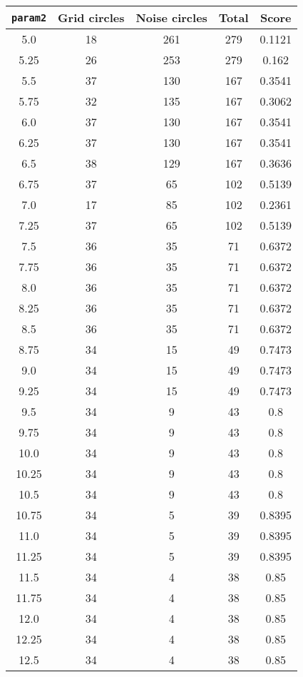 \documentclass[letterpaper, 12pt]{article}
\begin{document}
\begin{longtable}{|c|c|c|c|c|}
\hline
\textbf{\texttt{param2}} & \textbf{Grid circles} & \textbf{Noise circles} & \textbf{Total} & \textbf{Score} \\
\hline
5.0 & 18 & 261 & 279 & 0.1121 \\
\hline
5.25 & 26 & 253 & 279 & 0.162 \\
\hline
5.5 & 37 & 130 & 167 & 0.3541 \\
\hline
5.75 & 32 & 135 & 167 & 0.3062 \\
\hline
6.0 & 37 & 130 & 167 & 0.3541 \\
\hline
6.25 & 37 & 130 & 167 & 0.3541 \\
\hline
6.5 & 38 & 129 & 167 & 0.3636 \\
\hline
6.75 & 37 & 65 & 102 & 0.5139 \\
\hline
7.0 & 17 & 85 & 102 & 0.2361 \\
\hline
7.25 & 37 & 65 & 102 & 0.5139 \\
\hline
7.5 & 36 & 35 & 71 & 0.6372 \\
\hline
7.75 & 36 & 35 & 71 & 0.6372 \\
\hline
8.0 & 36 & 35 & 71 & 0.6372 \\
\hline
8.25 & 36 & 35 & 71 & 0.6372 \\
\hline
8.5 & 36 & 35 & 71 & 0.6372 \\
\hline
8.75 & 34 & 15 & 49 & 0.7473 \\
\hline
9.0 & 34 & 15 & 49 & 0.7473 \\
\hline
9.25 & 34 & 15 & 49 & 0.7473 \\
\hline
9.5 & 34 & 9 & 43 & 0.8 \\
\hline
9.75 & 34 & 9 & 43 & 0.8 \\
\hline
10.0 & 34 & 9 & 43 & 0.8 \\
\hline
10.25 & 34 & 9 & 43 & 0.8 \\
\hline
10.5 & 34 & 9 & 43 & 0.8 \\
\hline
10.75 & 34 & 5 & 39 & 0.8395 \\
\hline
11.0 & 34 & 5 & 39 & 0.8395 \\
\hline
11.25 & 34 & 5 & 39 & 0.8395 \\
\hline
11.5 & 34 & 4 & 38 & 0.85 \\
\hline
11.75 & 34 & 4 & 38 & 0.85 \\
\hline
12.0 & 34 & 4 & 38 & 0.85 \\
\hline
12.25 & 34 & 4 & 38 & 0.85 \\
\hline
12.5 & 34 & 4 & 38 & 0.85 \\

\end{longtable}
\end{document}
